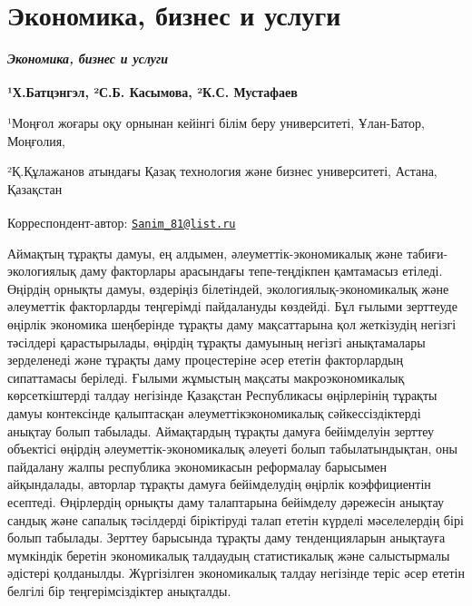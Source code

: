 \newpage
\let\cleardoublepage\clearpage
\part{Экономика, бизнес и услуги}
\begin{center}
{\large\bfseries\itshape Экономика, бизнес и услуги}
\end{center}

\begin{articleheader}

{\bfseries ¹Х.Батцэнгэл\textsuperscript{\envelope }, ²С.Б. Касымова, ²К.С.
Мустафаев}
\end{articleheader}
\begin{affiliation}
¹Моңғол жоғары оқу орнынан кейінгі білім беру университеті, Ұлан-Батор,
Моңғолия,

²Қ.Құлажанов атындағы Қазақ технология және бизнес университеті, Астана,
Қазақстан

\raggedright {\bfseries \textsuperscript{\envelope }}Корреспондент-автор: \href{mailto:Sanim_81@list.ru}{\nolinkurl{Sanim\_81@list.ru}}
\end{affiliation}

Аймақтың тұрақты дамуы, ең алдымен, әлеуметтік-экономикалық және
табиғи-экологиялық даму факторлары арасындағы тепе-теңдікпен қамтамасыз
етіледі. Өңірдің орнықты дамуы, өздеріңіз білетіндей,
экологиялық-экономикалық және әлеуметтік факторларды теңгерімді
пайдалануды көздейді. Бұл ғылыми зерттеуде өңірлік экономика шеңберінде
тұрақты даму мақсаттарына қол жеткізудің негізгі тәсілдері
қарастырылады, өңірдің тұрақты дамуының негізгі анықтамалары зерделенеді
және тұрақты даму процестеріне әсер ететін факторлардың сипаттамасы
беріледі. Ғылыми жұмыстың мақсаты макроэкономикалық көрсеткіштерді
талдау негізінде Қазақстан Республикасы өңірлерінің тұрақты дамуы
контексінде қалыптасқан әлеуметтік\-экономикалық сәйкессіздіктерді
анықтау болып табылады. Аймақтардың тұрақты дамуға бейімделуін зерттеу
объектісі өңірдің әлеуметтік-экономикалық әлеуеті болып табылатындықтан,
оны пайдалану жалпы республика экономикасын реформалау барысымен
айқындалады, авторлар тұрақты дамуға бейімделудің өңірлік коэффициентін
есептеді. Өңірлердің орнықты даму талаптарына бейімделу дәрежесін
анықтау сандық және сапалық тәсілдерді біріктіруді талап ететін күрделі
мәселелердің бірі болып табылады. Зерттеу барысында тұрақты даму
тенденцияларын анықтауға мүмкіндік беретін экономикалық талдаудың
статистикалық және салыстырмалы әдістері қолданылды. Жүргізілген
экономикалық талдау негізінде теріс әсер ететін белгілі бір
теңгерімсіздіктер анықталды.

